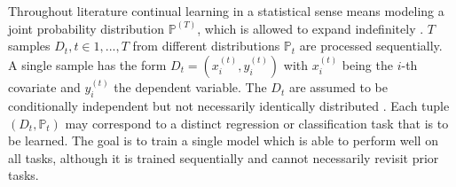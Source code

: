 Throughout literature continual learning in a statistical sense means modeling a joint probability distribution $\mathbb{P}^{(T)}$, which is allowed to expand indefinitely \cite{LW}. $T$ samples $D_t, t \in {1, ...,T}$ from different distributions $\mathbb{P}_t$ are processed sequentially. A single sample has the form $D_t = (x^{(t)}_i,y^{(t)}_i)$ with $x^{(t)}_i$ being the $i$-th covariate and $y^{(t)}_i$ the dependent variable. The $D_t$ are assumed to be conditionally independent but not necessarily identically distributed \cite{LW}. Each tuple $(D_t, \mathbb{P}_t)$ may correspond to a distinct regression or classification task that is to be learned. The goal is to train a single model which is able to perform well on all tasks, although it is trained sequentially and cannot necessarily revisit prior tasks. 